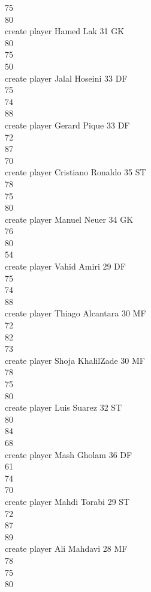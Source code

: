 \documentclass[]{article}
\begin{document}
{75\\
80\\
create player Hamed Lak 31 GK\\
80\\
75\\
50\\
create player Jalal Hoseini 33 DF\\
75\\
74\\
88\\
create player Gerard Pique 33 DF\\
72\\
87\\
70\\
create player Cristiano Ronaldo 35 ST\\
78\\
75\\
80\\
create player Manuel Neuer 34 GK\\
76\\
80\\
54\\
create player Vahid Amiri 29 DF\\
75\\
74\\
88\\
create player Thiago Alcantara 30 MF\\
72\\
82\\
73\\
create player Shoja KhalilZade 30 MF\\
78\\
75\\
80\\
create player Luis Suarez 32 ST\\
80\\
84\\
68\\
create player Mash Gholam 36 DF\\
61\\
74\\
70\\
create player Mahdi Torabi 29 ST\\
72\\
87\\
89\\
create player Ali Mahdavi 28 MF\\
78\\
75\\
80\\
}
\end{document}
